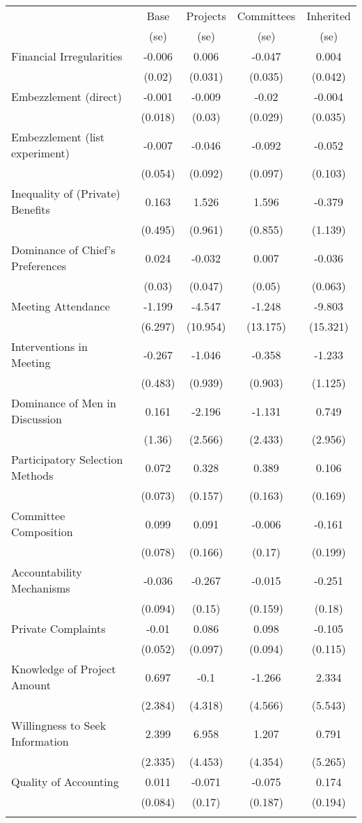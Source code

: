 \centering  
 \scriptsize  
 \begin{tabular}{lc|ccc}  
 	& Base      &   Projects &  Committees &  Inherited    \\   
 	& (se)      &   (se)      &  (se)      &  (se)    \\ \hline \hline  
 Financial Irregularities&-0.006&0.006&-0.047&0.004 \\  
 &(0.02)&(0.031)&(0.035)&(0.042) \\  
 Embezzlement (direct)&-0.001&-0.009&-0.02&-0.004 \\  
 &(0.018)&(0.03)&(0.029)&(0.035) \\  
 Embezzlement (list experiment)&-0.007&-0.046&-0.092&-0.052 \\  
 &(0.054)&(0.092)&(0.097)&(0.103) \\  
 Inequality of (Private) Benefits&0.163&1.526&1.596&-0.379 \\  
 &(0.495)&(0.961)&(0.855)&(1.139) \\  
 Dominance of Chief's Preferences&0.024&-0.032&0.007&-0.036 \\  
 &(0.03)&(0.047)&(0.05)&(0.063) \\  
 Meeting Attendance&-1.199&-4.547&-1.248&-9.803 \\  
 &(6.297)&(10.954)&(13.175)&(15.321) \\  
 Interventions in Meeting&-0.267&-1.046&-0.358&-1.233 \\  
 &(0.483)&(0.939)&(0.903)&(1.125) \\  
 Dominance of Men in Discussion&0.161&-2.196&-1.131&0.749 \\  
 &(1.36)&(2.566)&(2.433)&(2.956) \\  
 Participatory Selection Methods&0.072&0.328&0.389&0.106 \\  
 &(0.073)&(0.157)&(0.163)&(0.169) \\  
 Committee Composition&0.099&0.091&-0.006&-0.161 \\  
 &(0.078)&(0.166)&(0.17)&(0.199) \\  
 Accountability Mechanisms&-0.036&-0.267&-0.015&-0.251 \\  
 &(0.094)&(0.15)&(0.159)&(0.18) \\  
 Private Complaints&-0.01&0.086&0.098&-0.105 \\  
 &(0.052)&(0.097)&(0.094)&(0.115) \\  
 Knowledge of Project Amount&0.697&-0.1&-1.266&2.334 \\  
 &(2.384)&(4.318)&(4.566)&(5.543) \\  
 Willingness to Seek Information&2.399&6.958&1.207&0.791 \\  
 &(2.335)&(4.453)&(4.354)&(5.265) \\  
 Quality of Accounting&0.011&-0.071&-0.075&0.174 \\  
 &(0.084)&(0.17)&(0.187)&(0.194) \\  
 \hline \hline  
 \label{table_main_gov}  
 \end{tabular}  
